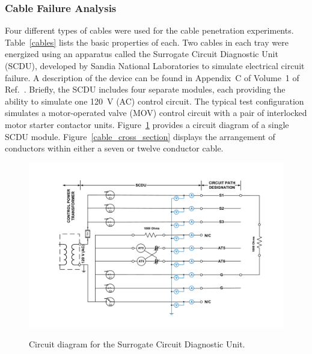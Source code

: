 \FloatBarrier

\subsubsection{Cable Failure Analysis}

Four different types of cables were used for the cable penetration experiments. Table~\ref{cables} lists the basic properties of each. Two cables in each tray were energized using an apparatus called the Surrogate Circuit Diagnostic Unit (SCDU), developed by Sandia National Laboratories to simulate electrical circuit failure. A description of the device can be found in Appendix~C of Volume~1 of Ref.~\cite{CAROLFIRE}. Briefly, the SCDU includes four separate modules, each providing the ability to simulate one 120~V (AC) control circuit. The typical test configuration simulates a motor-operated valve (MOV) control circuit with a pair of interlocked motor starter contactor units. Figure~\ref{circuit_diagram} provides a circuit diagram of a single SCDU module. Figure~\ref{cable_cross_section} displays the arrangement of conductors within either a seven or twelve conductor cable.

\begin{figure}[ht]
\vspace{-.4in}
\includegraphics[width=6.5in]{../FIGURES/Circuit_Drawing} \\
\vspace{-.5in}
\caption[Circuit diagram for the Surrogate Circuit Diagnostic Unit]{Circuit diagram for the Surrogate Circuit Diagnostic Unit.}
\label{circuit_diagram}
\end{figure}

